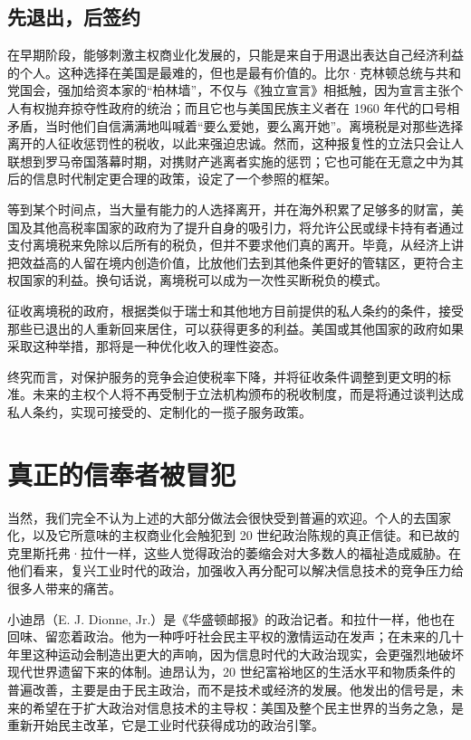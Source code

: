 \subsection{先退出，后签约}
在早期阶段，能够刺激主权商业化发展的，只能是来自于用退出表达自己经济利益的个人。这种选择在美国是最难的，但也是最有价值的。比尔·克林顿总统与共和党国会，强加给资本家的“柏林墙”，不仅与《独立宣言》相抵触，因为宣言主张个人有权抛弃掠夺性政府的统治；而且它也与美国民族主义者在 1960 年代的口号相矛盾，当时他们自信满满地叫喊着“要么爱她，要么离开她”。离境税是对那些选择离开的人征收惩罚性的税收，以此来强迫忠诚。然而，这种报复性的立法只会让人联想到罗马帝国落幕时期，对携财产逃离者实施的惩罚；它也可能在无意之中为其后的信息时代制定更合理的政策，设定了一个参照的框架。

等到某个时间点，当大量有能力的人选择离开，并在海外积累了足够多的财富，美国及其他高税率国家的政府为了提升自身的吸引力，将允许公民或绿卡持有者通过支付离境税来免除以后所有的税负，但并不要求他们真的离开。毕竟，从经济上讲把效益高的人留在境内创造价值，比放他们去到其他条件更好的管辖区，更符合主权国家的利益。换句话说，离境税可以成为一次性买断税负的模式。

征收离境税的政府，根据类似于瑞士和其他地方目前提供的私人条约的条件，接受那些已退出的人重新回来居住，可以获得更多的利益。美国或其他国家的政府如果采取这种举措，那将是一种优化收入的理性姿态。

终究而言，对保护服务的竞争会迫使税率下降，并将征收条件调整到更文明的标准。未来的主权个人将不再受制于立法机构颁布的税收制度，而是将通过谈判达成私人条约，实现可接受的、定制化的一揽子服务政策。

\section{真正的信奉者被冒犯}
当然，我们完全不认为上述的大部分做法会很快受到普遍的欢迎。个人的去国家化，以及它所意味的主权商业化会触犯到 20 世纪政治陈规的真正信徒。和已故的克里斯托弗·拉什一样，这些人觉得政治的萎缩会对大多数人的福祉造成威胁。在他们看来，复兴工业时代的政治，加强收入再分配可以解决信息技术的竞争压力给很多人带来的痛苦。

小迪昂（E. J. Dionne, Jr.）是《华盛顿邮报》的政治记者。和拉什一样，他也在回味、留恋着政治。他为一种呼吁社会民主平权的激情运动在发声；在未来的几十年里这种运动会制造出更大的声响，因为信息时代的大政治现实，会更强烈地破坏现代世界遗留下来的体制。迪昂认为，20 世纪富裕地区的生活水平和物质条件的普遍改善，主要是由于民主政治，而不是技术或经济的发展。他发出的信号是，未来的希望在于扩大政治对信息技术的主导权：美国及整个民主世界的当务之急，是重新开始民主改革，它是工业时代获得成功的政治引擎。

